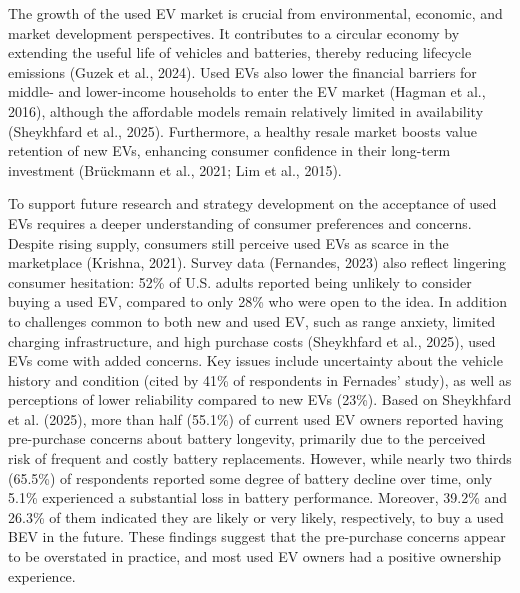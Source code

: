 \documentclass[a4paper,fleqn]{cas-sc}   %
\begin{document}
The growth of the used EV market is crucial from environmental, economic, and market development perspectives. It contributes to a circular economy by extending the useful life of vehicles and batteries, thereby reducing lifecycle emissions (Guzek et al., 2024). Used EVs also lower the financial barriers for middle- and lower-income households to enter the EV market (Hagman et al., 2016), although the affordable models remain relatively limited in availability (Sheykhfard et al., 2025). Furthermore, a healthy resale market boosts value retention of new EVs, enhancing consumer confidence in their long-term investment (Brückmann et al., 2021; Lim et al., 2015). 

To support future research and strategy development on the acceptance of used EVs requires a deeper understanding of consumer preferences and concerns. Despite rising supply, consumers still perceive used EVs as scarce in the marketplace (Krishna, 2021). Survey data (Fernandes, 2023) also reflect lingering consumer hesitation: 52\% of U.S. adults reported being unlikely to consider buying a used EV, compared to only 28\% who were open to the idea. In addition to challenges common to both new and used EV, such as range anxiety, limited charging infrastructure, and high purchase costs (Sheykhfard et al., 2025), used EVs come with added concerns. Key issues include uncertainty about the vehicle history and condition (cited by 41\% of respondents in Fernades' study), as well as perceptions of lower reliability compared to new EVs (23\%). Based on Sheykhfard et al. (2025), more than half (55.1\%) of current used EV owners reported having pre-purchase concerns about battery longevity, primarily due to the perceived risk of frequent and costly battery replacements. However, while nearly two thirds (65.5\%) of respondents reported some degree of battery decline over time, only 5.1\% experienced a substantial loss in battery performance. Moreover, 39.2\% and 26.3\% of them indicated they are likely or very likely, respectively, to buy a used BEV in the future. These findings suggest that the pre-purchase concerns appear to be overstated in practice, and most used EV owners had a positive ownership experience. 
\end{document}
